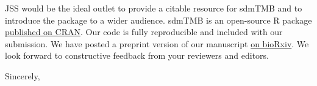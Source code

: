 \documentclass[letterpaper]{letter}
\providecommand{\pkg}[1]{{\normalfont\fontseries{b}\selectfont #1}}
\let\proglang=\textsf
\begin{document}
\begin{letter}{}
JSS would be the ideal outlet to provide a citable resource for \pkg{sdmTMB} and to introduce the package to a wider audience. \pkg{sdmTMB} is an open-source \proglang{R} package \href{https://CRAN.R-project.org/package=sdmTMB}{published on CRAN}. Our code is fully reproducible and included with our submission. We have posted a preprint version of our manuscript \href{https://doi.org/10.1101/2022.03.24.485545}{on bioRxiv}. We look forward to constructive feedback from your reviewers and editors.

\vspace{3mm}
\closing{Sincerely,\\
}

\end{letter}
\end{document}
